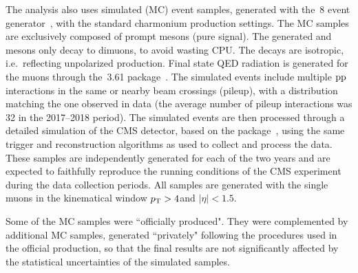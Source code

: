 The analysis also uses simulated (MC) event samples, 
generated with the \PYTHIA\,8 event generator~\cite{bib:Pythia},
with the standard charmonium production settings.
The MC samples are exclusively composed of prompt mesons (pure signal).
The generated \jpsi and \psip 
mesons only decay to dimuons, to avoid wasting CPU.
The decays are isotropic, i.e.\ reflecting unpolarized production.
Final state QED radiation is generated
for the muons through the 
\PHOTOS\,3.61 package~\cite{PHOTOS2}.
The simulated events include multiple $\text{p}\text{p}$ interactions in the same
or nearby beam crossings (pileup), with a distribution matching the one observed in data
(the average number of pileup interactions was 32 in the 2017--2018 period). 
The simulated events are then processed through a detailed simulation of the CMS detector,
based on the \GEANTfour package~\cite{bib:geant4}, 
using the same trigger and reconstruction algorithms as used to collect and process the data. 
These samples are independently generated for each of the two years and are
expected to faithfully reproduce the running conditions of the CMS experiment 
during the data collection periods.
All samples are generated with the single muons in the kinematical window 
$p_\text{T} > 4$\GeV and $|\eta| < 1.5$.

Some of the MC samples were ``officially produced".
They were complemented by additional MC samples, generated ``privately"
following the procedures used in the official production, 
so that the final results are not significantly affected by the statistical uncertainties 
of the simulated samples.
%
%

